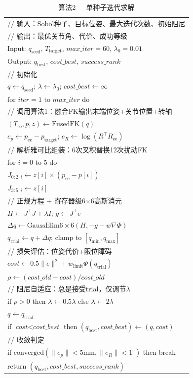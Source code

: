 \documentclass[twocolumn,a4paper,10pt]{ctexart}
\makeatletter
\newenvironment{algotable}[2]{%
  \begin{table}[htbp]
  \centering
  \caption{#2}
  \label{#1}
  \footnotesize\ttfamily
  \begin{tabular}{@{}p{\columnwidth}@{}}
  \toprule
}{%
  \\\bottomrule
  \end{tabular}
  \end{table}
}
\makeatother
\begin{document}
\begin{algotable}{alg:lm}{算法2~~~单种子迭代求解}
// 输入：Sobol种子、目标位姿、最大迭代次数、初始阻尼\\
// 输出：最优关节角、代价、成功等级\\
Input: $q_{\mathrm{seed}}$, $T_{\mathrm{target}}$, $\textit{max\_iter}{=}60$, $\lambda_0{=}0.01$\\
Output: $q_{\mathrm{best}}$, $\textit{cost\_best}$, $\textit{success\_rank}$\\[2pt]
// 初始化\\
\quad $q\leftarrow q_{\mathrm{seed}}$; $\lambda\leftarrow\lambda_0$; $\textit{cost\_best}\leftarrow\infty$\\
\quad for $\textit{iter}=1$ to $\textit{max\_iter}$ do\\
// 调用算法1：融合FK输出末端位姿+关节位置+转轴\\
\qquad $(T_{\mathrm{ee}},p,z)\leftarrow\mathrm{FusedFK}(q)$\\
\qquad $e_p\leftarrow p_{\mathrm{ee}}-p_{\mathrm{target}}$; $e_R\leftarrow\log(R^\top R_{\mathrm{ee}})$\\
// 解析雅可比组装：6次叉积替换12次扰动FK\\
\qquad for $i=0$ to $5$ do\\
\qquad\quad $J_{0:2,i}\leftarrow z[i]\times(p_{\mathrm{ee}}-p[i])$\\
\qquad\quad $J_{3:5,i}\leftarrow z[i]$\\
// 正规方程 + 寄存器级6×6高斯消元\\
\qquad $H\leftarrow J^\top J+\lambda I$; $g\leftarrow J^\top e$\\
\qquad $\Delta q\leftarrow\mathrm{GaussElim6\times6}(H,-g-w\nabla\Phi)$\\
\qquad $q_{\mathrm{trial}}\leftarrow q+\Delta q$; clamp to $[q_{\min},q_{\max}]$\\
// 损失评估：位姿代价+限位障碍\\
\qquad $\textit{cost}\leftarrow0.5\|e\|^2+w_{\mathrm{limit}}\Phi(q_{\mathrm{trial}})$\\
\qquad $\rho\leftarrow(\textit{cost\_old}-\textit{cost})/\textit{cost\_old}$\\
// 阻尼自适应：总是接受trial，仅调节$\lambda$\\
\qquad if $\rho>0$ then $\lambda\leftarrow0.5\lambda$ else $\lambda\leftarrow2\lambda$\\
\qquad $q\leftarrow q_{\mathrm{trial}}$\\
\qquad if $\textit{cost}<\textit{cost\_best}$ then $(q_{\mathrm{best}},\textit{cost\_best})\leftarrow(q,\textit{cost})$\\
// 收敛判定\\
\qquad if $\mathrm{converged}(\|e_p\|{<}5\mathrm{mm},\|e_R\|{<}1^\circ)$ then break\\
\quad return $(q_{\mathrm{best}},\textit{cost\_best},\textit{success\_rank})$
\end{algotable}
\end{document}

